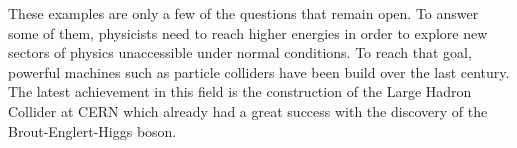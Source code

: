     These examples are only a few of the questions that remain open. To answer some of them, physicists need to reach higher energies in order to explore new sectors of physics unaccessible under normal conditions. To reach that goal, powerful machines such as particle colliders have been build over the last century. The latest achievement in this field is the construction of the Large Hadron Collider at CERN which already had a great success with the discovery of the Brout-Englert-Higgs boson.

